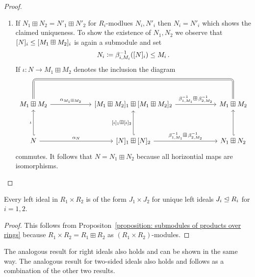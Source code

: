 \begin{proof}
  \leavevmode
  \begin{enumerate}[start=2]
    \item
      If $N_1 \boxplus N_2 = N'_1 \boxplus N'_2$ for $R_i$-modlues $N_i, N'_i$ then $N_i = N'_i$ which shows the claimed uniqueness.
      To show the existence of $N_1, N_2$ we observe that $[N]_i \leq [M_1 \boxplus M_2]_i$ is again a submodule and set
      \[
                    N_i
        \coloneqq    \beta_{i,M_i}^{-1}( [N]_i )
        \leq  M_i \,.
      \]
      If $\iota \colon N \to M_1 \boxplus M_2$ denotes the inclusion the diagram
      \[
        \begin{tikzcd}[row sep = huge, column sep = 6em]
            M_1 \boxplus M_2
            \arrow[rounded corners,
                   equal,
                   to path =
                   { -- ([yshift=1cm] \tikztostart.north)
                     -| (\tikztotarget) }
                  ]{rr}
            \arrow{r}[above]{\alpha_{M_1 \boxplus M_2}}
          & {[M_1 \boxplus M_2]_1} \boxplus {[M_1 \boxplus M_2]_2}
            \arrow{r}[above]{\beta_{1,M_1}^{-1} \boxplus \, \beta_{2,M_2}^{-1}}
          & M_1 \boxplus M_2
          \\
            N
            \arrow[hook']{u}[left]{\iota}
            \arrow{r}[above]{\alpha_N}
          & {[N]_1 \boxplus [N]_2}
            \arrow[hook']{u}[left]{[\iota]_1 \boxplus [\iota]_2}
            \arrow{r}[above]{\beta_{1,M_1}^{-1} \boxplus \, \beta_{2,M_2}^{-1}}
          & N_1 \boxplus N_2
            \arrow[hook']{u}
        \end{tikzcd}
      \]
      commutes.
      It follows that $N = N_1 \boxplus N_2$ because all horizontial maps are isomorphisms.
    \qedhere
  \end{enumerate}
\end{proof}


\begin{corollary}
  \label{corollary: ideals in products of rings}
  Every left ideal in $R_1 \times R_2$ is of the form $J_1 \times J_2$ for unique left ideals $J_i \trianglelefteq R_i$ for $i = 1, 2$.
\end{corollary}


\begin{proof}
  This follows from Propositon~\ref{proposition: submodules of products over rings} because $R_1 \times R_2 = R_1 \boxplus R_2$ as $(R_1 \times R_2)$-modules.
\end{proof}


\begin{remark}
  \label{remark: right and two-sided ideals in products of rings}
  The analogous result for right ideals also holds and can be shown in the same way.
  The analogous result for two-sided ideals also holds and follows as a combination of the other two results.
\end{remark}


